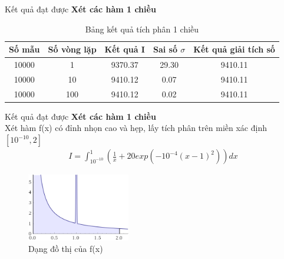 \documentclass{beamer}
\begin{document}
\begin{frame}{Kết quả đạt được}\vspace{4pt}
  \textbf{Xét các hàm 1 chiều}\\
  \vspace{0.4em}
    \begin{table}[H]
        \centering
        \begin{tabular}{ |c|c|c|c|c| }
         \hline
         \multicolumn{1}{|c}{Số mẫu} & \multicolumn{1}{|c|}{Số vòng lặp} & \multicolumn{1}{|c|}{Kết quả I} & \multicolumn{1}{|c|}{Sai số $\sigma$} & \multicolumn{1}{|c|}{Kết quả giải tích số} \\
         \hline
         10000 & 1  & 9370.37 & 29.30 & 9410.11 \\
         \hline
         10000 & 10  & 9410.12 & 0.07 & 9410.11 \\
         \hline
         10000 & 100  & 9410.12 & 0.02 & 9410.11 \\
         \hline
        \end{tabular}
        \caption{Bảng kết quả tích phân 1 chiều}
        \label{1d_x02505075}
       \end{table}

\end{frame}

\begin{frame}{Kết quả đạt được}\vspace{4pt}
  \textbf{Xét các hàm 1 chiều}\\
  \vspace{0.4em}
  Xét hàm f(x) có đỉnh nhọn cao và hẹp, lấy tích phân trên miền xác định $[10^{-10},2]$
  \begin{align}
      I = \int_{10^{-10}}^{1}\left({\frac{1}{x}+20exp(-10^{-4}(x-1)^2)}\right)dx
  \end{align}
  \begin{figure}[H]
      \centering
      \includegraphics[width=0.4\textwidth]{1d_20.png}
      \caption{Dạng đồ thị của f(x)}\label{hinh3.2}
  \end{figure}
\end{frame}
\end{document}
